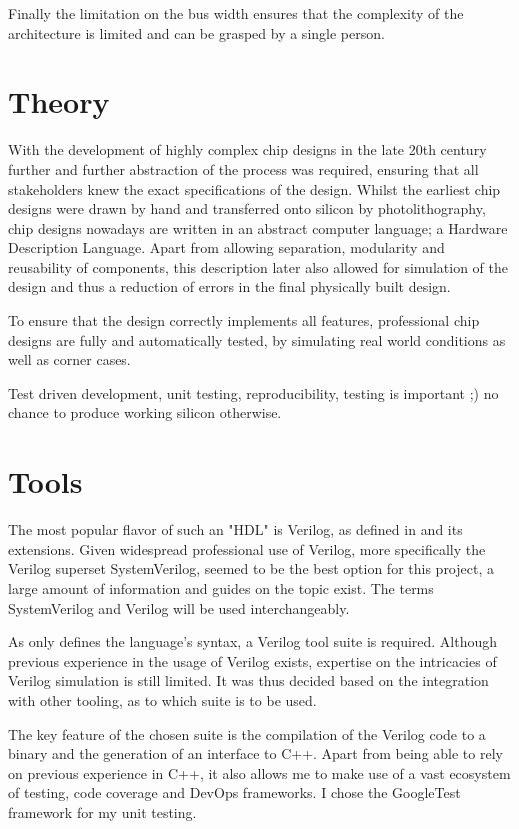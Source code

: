 Finally the limitation on the bus width ensures that the complexity of the architecture is limited and can be grasped by a single person.


\section{Theory}
With the development of highly complex chip designs in the late 20th century further and further abstraction of the process was required, ensuring that all stakeholders knew the exact specifications of the design. \cite{1214355} Whilst the earliest chip designs were drawn by hand and transferred onto silicon by photolithography, chip designs nowadays are written in an abstract computer language; a Hardware Description Language. Apart from allowing separation, modularity and reusability of components, this description later also allowed for simulation of the design and thus a reduction of errors in the final physically built design. 

To ensure that the design correctly implements all features, professional chip designs are fully and automatically tested, by simulating real world conditions as well as corner cases. 



Test driven development, unit testing, reproducibility, testing is important ;) no chance to produce working silicon otherwise.

\section{Tools}

The most popular flavor of such an "HDL" is Verilog, as defined in \cite{10458102} and its extensions. Given widespread professional use of Verilog, more specifically the Verilog superset SystemVerilog, seemed to be the best option for this project, a large amount of information and guides on the topic exist. The terms SystemVerilog and Verilog will be used interchangeably. 

As \cite{10458102} only defines the language's syntax, a Verilog tool suite is required. Although previous experience in the usage of Verilog exists, expertise on the intricacies of Verilog simulation is still limited. It was thus decided based on the integration with other tooling, as to which suite is to be used. 

The key feature of the chosen suite is the compilation of the Verilog code to a binary and the generation of an interface to C++. Apart from being able to rely on previous experience in C++, it also allows me to make use of a vast ecosystem of testing, code coverage and DevOps frameworks. I chose the GoogleTest framework for my unit testing. 


